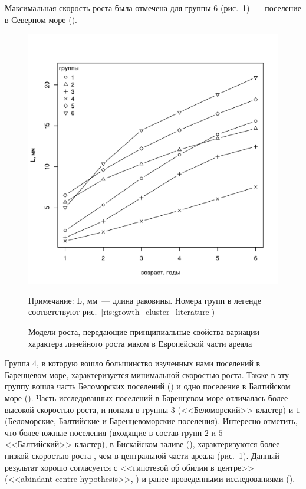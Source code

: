Максимальная скорость роста была отмечена для группы $6$ (рис.~\ref{ris:growth_model_europe})~--- поселение в Северном море (\cite{Vogel_1959}). 
	\begin{figure}[p]
	\begin{center}	
		\includegraphics[width=\textwidth]{../Growth_sravnenie/Europe_growth_groups1.pdf}
	\end{center}
		\caption{Модели роста, передающие принципиальные свойства вариации характера линейного роста маком в Европейской части ареала}

	\footnotesize{Примечание: L, мм~--- длина раковины. Номера групп в легенде соответствуют рис.~\ref{ris:growth_cluster_literature})}
		\label{ris:growth_model_europe}
	\end{figure}
Группа $4$, в которую вошло большинство изученных нами поселений в Баренцевом море, характеризуется минимальной скоростью роста.
Также в эту группу вошла часть Беломорских поселений (\cite{Semenova_1970}) и одно поселение в Балтийском море (\cite{Bergh_1974}).
Часть исследованных поселений в Баренцевом море отличалась более высокой скоростью роста, и попала в группы $3$ (<<Беломорский>> кластер) и $1$ (Беломорские, Балтийские и Баренцевоморские поселения).
Интересно отметить, что более южные поселения (входящие в состав групп $2$ и $5$~--- <<Балтийский>> кластер), в Бискайском заливе (\cite{Bachelet_1980}), характеризуются более низкой скоростью роста , чем в центральной части ареала (рис.~\ref{ris:growth_model_europe}).
Данный результат хорошо согласуется с <<гипотезой об обилии в центре>> (<<abindant-centre hypothesis>>, \cite{Sagarin_et_al_2006}) и ранее проведенными исследованиями (\cite{Beukema_Meehan_1985, Hummel_et_al_1998}).

